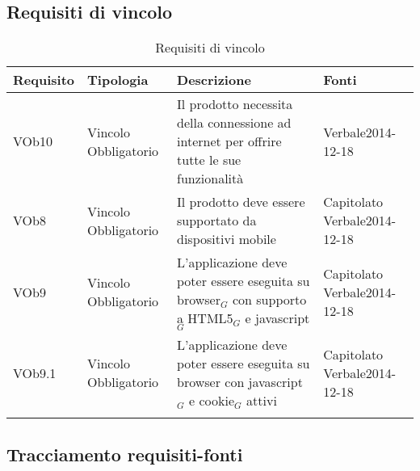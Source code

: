\newpage
\subsection{ Requisiti di vincolo}
	
\begin{longtable}{|l|p{2.5cm}|p{5cm}|p{3.5cm}|}
\hline
\textbf{Requisito} & \textbf{Tipologia} & \textbf{Descrizione} & \textbf{Fonti} \\
\hline
VOb10 & Vincolo \linebreak Obbligatorio & Il prodotto necessita della connessione ad internet per offrire tutte le sue funzionalità & Verbale2014-12-18 \linebreak \\
\hline
VOb8 & Vincolo \linebreak Obbligatorio & Il prodotto deve essere supportato da dispositivi mobile & Capitolato \linebreak Verbale2014-12-18 \linebreak \\
\hline
VOb9 & Vincolo \linebreak Obbligatorio & L'applicazione deve poter essere eseguita su browser$_G$ con supporto a HTML5$_G$ e javascript$_G$ & Capitolato \linebreak Verbale2014-12-18 \linebreak \\
\hline
VOb9.1 & Vincolo \linebreak Obbligatorio & L'applicazione deve poter essere eseguita su browser con javascript$_G$ e cookie$_G$ attivi & Capitolato \linebreak  Verbale2014-12-18 \linebreak  \\
\hline
\caption{Requisiti di vincolo}
\end{longtable}
\subsection{ Tracciamento requisiti-fonti}
	
